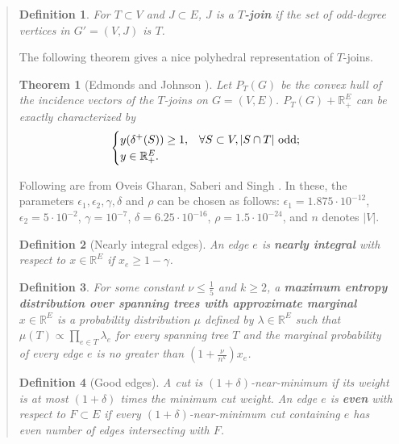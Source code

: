 \documentclass[11pt,letterpaper]{article}
\newtheorem{thm}{Theorem}
\newtheorem{defn}{Definition}
\begin{document}
\begin{quote}
\begin{defn}
For $T\subset V$ and $J\subset E$, $J$ is a \textbf{$T$-join} if the set of odd-degree vertices in $G'=(V,J)$ is $T$.
\end{defn}

The following theorem gives a nice polyhedral representation of $T$-joins.

\begin{thm}[Edmonds and Johnson \cite{EJ}]
\label{t:tjoinpr}
Let $P_T(G)$ be the convex hull of the incidence vectors of the $T$-joins on $G=(V,E)$. $P_T(G)+\mathbb{R}_+^E$ can be exactly characterized by
\begin{equation}\label{e:tjoinpr}
\begin{cases}
y(\delta^+(S))\geq 1 ,&\forall S\subset V , |S\cap T|\textnormal{ odd};\\
y\in \mathbb{R}_+^E .&
\end{cases}
\end{equation}
\end{thm}

Following are from Oveis Gharan, Saberi and Singh \cite{OSS}. In these, the parameters $\epsilon_1, \epsilon_2, \gamma, \delta$ and $\rho$ can be chosen as follows: $\epsilon_1 = 1.875\cdot 10^{-12}$, $\epsilon_2 = 5\cdot 10^{-2}$, $\gamma = 10^{-7}$, $\delta=6.25 \cdot 10^{-16}$, $\rho = 1.5\cdot 10^{-24}$, and $n$ denotes $|V|$.

\begin{defn}[Nearly integral edges]\label{d:niedges}
An edge $e$ is \textbf{nearly integral} with respect to $x\in\mathbb{R}^E$ if $x_e\geq 1-\gamma$.
\end{defn}

\begin{defn}\label{d:approxm}
For some constant $\nu\leq\frac{1}{5}$ and $k\geq 2$, a \textbf{maximum entropy distribution over spanning trees with approximate marginal} $x\in\mathbb{R}^E$ is a probability distribution $\mu$ defined by $\lambda\in\mathbb{R}^E$ such that $\mu(T)\propto\prod_{e\in T}\lambda_e$ for every spanning tree $T$ and the marginal probability of every edge $e$ is no greater than $(1+\frac{\nu}{n^k})x_e$.
\end{defn}

\begin{defn}[Good edges]\label{d:goodedges}
A cut is $(1+\delta)$-near-minimum if its weight is at most $(1+\delta)$ times the minimum cut weight. An edge $e$ is \textbf{even} with respect to $F\subset E$ if every $(1+\delta)$-near-minimum cut containing $e$ has even number of edges intersecting with $F$.


\end{defn}
\end{quote}
\end{document}
